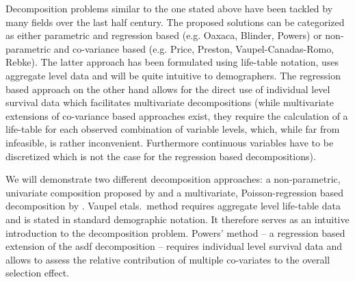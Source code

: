 \documentclass[12pt, parskip=half]{scrartcl}
\begin{document}
Decomposition problems similar to the one stated above have been tackled by many fields over the last half century. The proposed solutions can be categorized as either parametric and regression based (e.g. Oaxaca, Blinder, Powers) or non-parametric and co-variance based (e.g. Price, Preston, Vaupel-Canadas-Romo, Rebke). The latter approach has been formulated using life-table notation, uses aggregate level data and will be quite intuitive to demographers. The regression based approach on the other hand allows for the direct use of individual level survival data which facilitates multivariate decompositions (while multivariate extensions of co-variance based approaches exist, they require the calculation of a life-table for each observed combination of variable levels, which, while far from infeasible, is rather inconvenient. Furthermore continuous variables have to be discretized which is not the case for the regression based decompositions).

We will demonstrate two different decomposition approaches: a non-parametric, univariate composition proposed by \autocite{Vaupel2002} and a multivariate, Poisson-regression based decomposition by \autocite{Powers2011}. Vaupel etals.~method requires aggregate level life-table data and is stated in standard demographic notation. It therefore serves as an intuitive introduction to the decomposition problem. Powers' method -- a regression based extension of the asdf decomposition -- requires individual level survival data and allows to assess the relative contribution of multiple co-variates to the overall selection effect.



\end{document}

